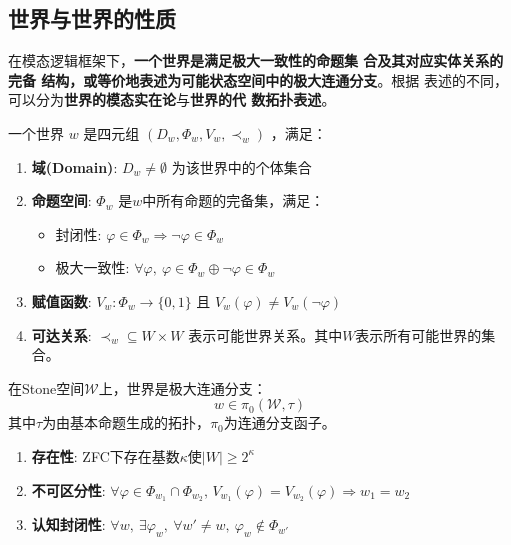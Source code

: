 \documentclass[lang=cn,newtx,10pt,scheme=chinese]{elegantbook}
\begin{document}
\subsection{世界与世界的性质}
在模态逻辑框架下，\textbf{一个世界是满足极大一致性的命题集
    合及其对应实体关系的完备
    结构，或等价地表述为可能状态空间中的极大连通分支}。根据
表述的不同，可以分为\textbf{世界的模态实在论}与\textbf{世界的代
    数拓扑表述}。

\begin{definition}[世界的模态实在论]
    一个世界 $w$ 是四元组 $(D_w, \varPhi_w, V_w, \prec_w)$ ，满足：
    \begin{enumerate}
        \item \textbf{域(Domain)}: $D_w \neq \emptyset$ 为该世界中的个体集合
        \item \textbf{命题空间}: $\varPhi_w$ 是$w$中所有命题的完备集，满足：
              \begin{itemize}
                  \item 封闭性: $\varphi \in \varPhi_w \Rightarrow \neg\varphi \in \varPhi_w$
                  \item 极大一致性: $\forall\varphi,\ \varphi \in \varPhi_w \oplus \neg\varphi \in \varPhi_w$
              \end{itemize}
        \item \textbf{赋值函数}: $V_w: \varPhi_w \to \{0,1\}$ 且 $V_w(\varphi) \neq V_w(\neg\varphi)$
        \item \textbf{可达关系}: $\prec_w \subseteq W \times W$ 表示可能世界关系。其中\(W\)表示所有可能世界的集合。
    \end{enumerate}
\end{definition}

\begin{definition}[世界的代数拓扑表述]
    在Stone空间$\mathcal{W}$上，世界是极大连通分支：
    \[ w \in \pi_0(\mathcal{W}, \tau) \]
    其中$\tau$为由基本命题生成的拓扑，$\pi_0$为连通分支函子。
\end{definition}

\begin{theorem}[世界的基本性质]
    \begin{enumerate}
        \item \textbf{存在性}: ZFC下存在基数$\kappa$使$|W| \geq 2^\kappa$
        \item \textbf{不可区分性}:
              $\forall \varphi \in \varPhi_{w_1} \cap \varPhi_{w_2},\, V_{w_1}(\varphi)=V_{w_2}(\varphi) \Rightarrow w_1 = w_2$
        \item \textbf{认知封闭性}: $\forall w,\ \exists\varphi_w,\ \forall w' \neq w,\ \varphi_w \notin \varPhi_{w'}$
    \end{enumerate}
\end{theorem}
\end{document}
